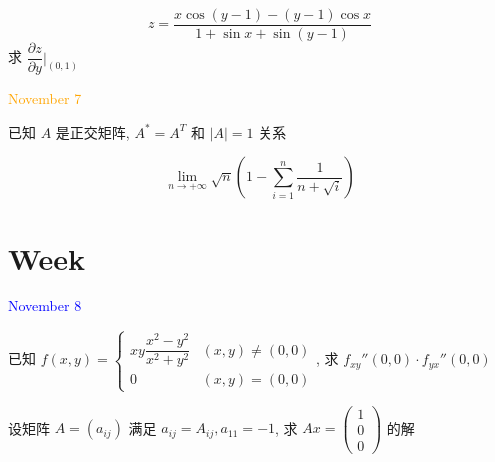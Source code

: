 \begin{solution}
	
\end{solution}

\begin{example}[][Exam: 37.1.12]
	$$z=\dfrac{x\cos(y-1)-(y-1)\cos x}{1+\sin x+\sin(y-1)}$$
	求 $\dfrac{\partial z}{\partial y}\big|_{(0,1)}$
\end{example}

\begin{solution}
	
\end{solution}


\textcolor{orange}{November 7}

\begin{example}[][Exam: 37.1.13]
	已知 $A$ 是正交矩阵, $A^{*}=A^{T}$ 和 $|A|=1$ 关系
\end{example}

\begin{solution}
	
\end{solution}

\begin{example}[][Exam: 37.1.14]
	$$\lim\limits_{n\to +\infty}\sqrt{n}\left( 1-\sum\limits_{i=1}^{n}\dfrac{1}{n+\sqrt{i}}\right)$$
\end{example} 

\begin{solution}
	
\end{solution}


\section{Week }
\textcolor{blue}{November 8}

\begin{example}[][Exam: 37.2.1]
	已知 $f(x,y)=
\begin{cases}
	xy\dfrac{x^2-y^2}{x^2+y^2} & (x,y)\neq(0,0)\\
	0 & (x,y)=(0,0)
\end{cases}$, 求 $f_{xy}''(0,0)\cdot f_{yx}''(0,0)$
\end{example}

\begin{solution}
	
\end{solution}

\begin{example}[][Exam: 37.2.2]
	设矩阵 $A=(a_{ij})$ 满足 $a_{ij}=A_{ij},a_{11}=-1$, 求 $Ax=\begin{pmatrix}
		1 \\
		0 \\
		0
	\end{pmatrix}$ 的解

\end{example}

